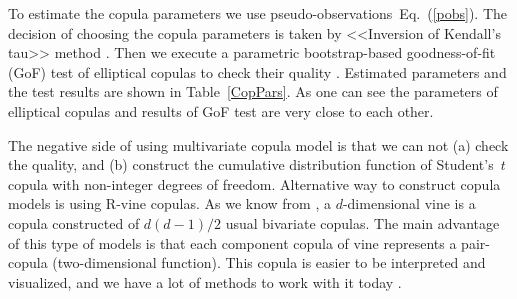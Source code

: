 \documentclass{llncs}
\begin{document}
%
To estimate the copula parameters we use %
pseudo-observations~Eq.~(\ref{pobs}). The decision of choosing the copula parameters is taken by <<Inversion of Kendall’s tau>> method \cite{Koj2010}. Then we execute a parametric bootstrap-based goodness-of-fit (GoF) test of elliptical copulas to check their quality \cite{Gen2009}. Estimated parameters and the test results are shown in Table~\ref{CopPars}. As one can see the parameters of elliptical copulas and results of GoF test are very close to each other.


The negative side of using multivariate copula model is that we can not (a) check the quality, and (b) construct the cumulative distribution function of Student's~$t$ copula with non-integer degrees of freedom.
%
Alternative way to construct copula models is using R-vine copulas. As we know from \cite{Bedfort2002}, a $d$-dimensional vine is a copula constructed of $d(d - 1)/2$ usual bivariate copulas. %
%
The main advantage of this type of models is that each component copula of vine represents a pair-copula (two-dimensional function). %
This copula is easier to be interpreted and visualized, and we have a lot of methods to work with it today \cite{Cooke2015, Czado2010, Dissmann2013}. 
\end{document}
